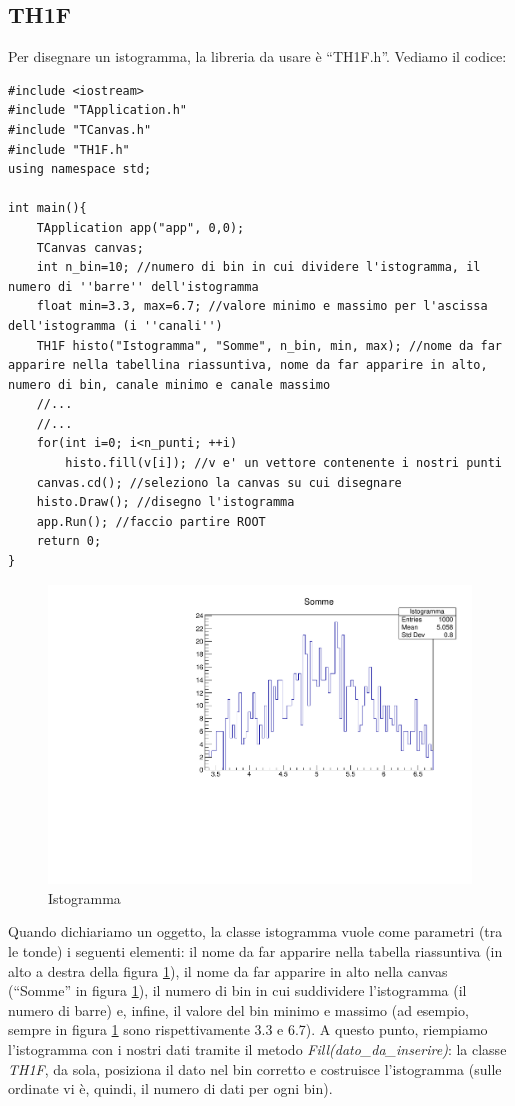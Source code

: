 \subsection{TH1F}
Per disegnare un istogramma, la libreria da usare è ``TH1F.h''. Vediamo il codice:
\begin{lstlisting}
#include <iostream>
#include "TApplication.h"
#include "TCanvas.h"
#include "TH1F.h"
using namespace std;

int main(){
	TApplication app("app", 0,0);
	TCanvas canvas;
	int n_bin=10; //numero di bin in cui dividere l'istogramma, il numero di ''barre'' dell'istogramma
	float min=3.3, max=6.7; //valore minimo e massimo per l'ascissa dell'istogramma (i ''canali'')
	TH1F histo("Istogramma", "Somme", n_bin, min, max); //nome da far apparire nella tabellina riassuntiva, nome da far apparire in alto, numero di bin, canale minimo e canale massimo
	//...
	//...
	for(int i=0; i<n_punti; ++i)
		histo.fill(v[i]); //v e' un vettore contenente i nostri punti
	canvas.cd(); //seleziono la canvas su cui disegnare
	histo.Draw(); //disegno l'istogramma
	app.Run(); //faccio partire ROOT
	return 0;	
}
\end{lstlisting}
\begin{figure} [h!]
	\centering
	\includegraphics[scale=\scaledim]{Immagini/histo.pdf}  
	\caption{Istogramma}
	\label{root3}
\end{figure}
Quando dichiariamo un oggetto, la classe istogramma vuole come parametri  (tra le tonde) i seguenti elementi: il nome da far apparire nella tabella riassuntiva (in alto a destra della figura \ref{root3}), il nome da far apparire in alto nella canvas (``Somme'' in figura \ref{root3}), il numero di bin in cui suddividere l'istogramma (il numero di barre) e, infine, il valore del bin minimo e massimo (ad esempio, sempre in figura \ref{root3} sono rispettivamente 3.3 e 6.7). A questo punto, riempiamo l'istogramma con i nostri dati tramite il metodo \emph{Fill(\emph{dato\_da\_inserire})}: la classe \emph{TH1F}, da sola, posiziona il dato nel bin corretto e costruisce l'istogramma (sulle ordinate vi è, quindi, il numero di dati per ogni bin).

